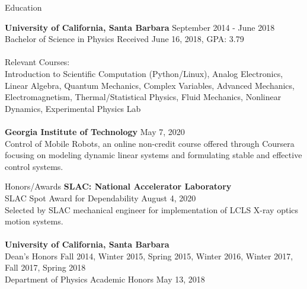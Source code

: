 \documentclass{resume} %
\begin{document}

\begin{rSection}{Education}

{\bf University of California, Santa Barbara} \hfill {September 2014 - June 2018} 
\\ Bachelor of Science in Physics \hfill {Received June 16, 2018, GPA: 3.79} \\ \\
{Relevant Courses:}
\\ Introduction to Scientific Computation (Python/Linux), Analog Electronics, Linear Algebra, Quantum Mechanics, Complex Variables, Advanced Mechanics, Electromagnetism, Thermal/Statistical Physics, Fluid Mechanics, Nonlinear Dynamics, Experimental Physics Lab \\ \\
{\bf Georgia Institute of Technology} \hfill {May 7, 2020}
\\ Control of Mobile Robots, an online non-credit course offered through Coursera focusing on modeling dynamic linear systems and formulating stable and effective control systems.
\end{rSection}


\begin{rSection}{Honors/Awards}
{\bf SLAC: National Accelerator Laboratory}
\\SLAC Spot Award for Dependability \hfill {August 4, 2020}
\\Selected by SLAC mechanical engineer for implementation of LCLS X-ray optics motion systems.\\ \\
{\bf University of California, Santa Barbara}
\\Dean’s Honors \hfill {Fall 2014, Winter 2015, Spring 2015, Winter 2016, Winter 2017, Fall 2017, Spring 2018}
\\Department of Physics Academic Honors \hfill {May 13, 2018}
\end{rSection}

\end{document}
